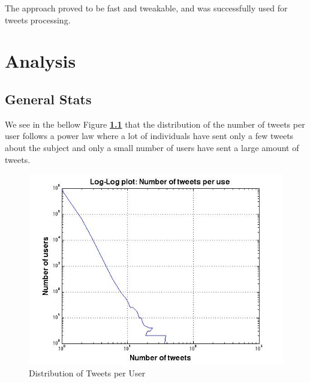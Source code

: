 \documentclass[12pt]{report}
\begin{document}
The approach proved to be fast and tweakable, and was successfully used for tweets processing. 


\chapter{Analysis}

\section{General Stats}

We see in the bellow Figure \textbf{\ref{fig:tpu}} that the distribution of the number of tweets per user follows a power law where a lot of individuals have sent only a few tweets about the subject and only a small number of users have sent a large amount of tweets. 


 
 \begin{figure}[H]
\centerline{ \noindent\includegraphics[width=1\textwidth]{img/anal/loglog_users_tweets}}
 \caption{Distribution of Tweets per User}
 \label{fig:tpu}
\end{figure}
\end{document}
